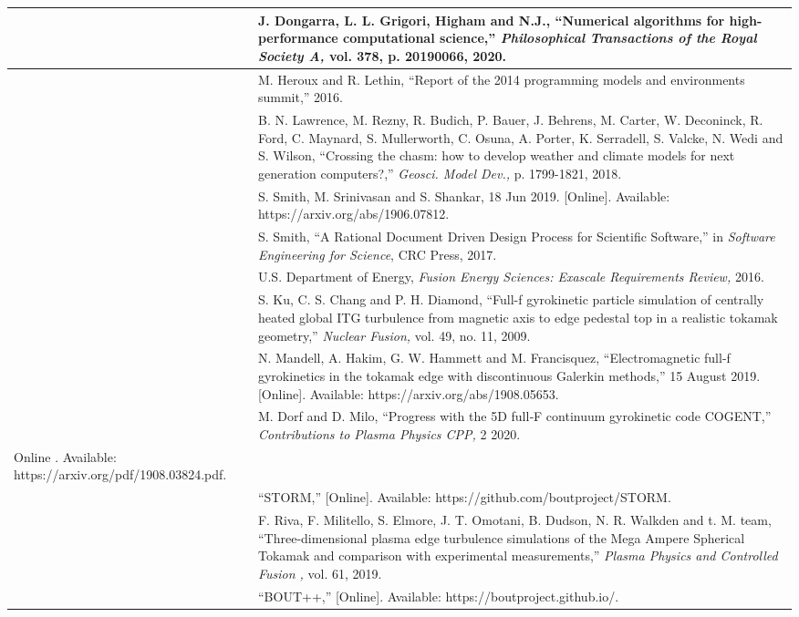 \documentclass{article}
\begin{document}
\baselineskip=12pt
\begin{tabular}{|>{\raggedright}p{8pt}|>{\raggedright}p{312pt}|}
\hline
[1]  & J. Dongarra, L. L. Grigori, Higham and N.J., ``Numerical algorithms for 
high-performance computational science,'' \textit{Philosophical Transactions of 
the Royal Society A, }vol. 378, p. 20190066, 2020. \tabularnewline
\hline
[2]  & M. Heroux and R. Lethin, ``Report of the 2014 programming models and environments 
summit,'' 2016.\tabularnewline
\hline
[3]  & B. N. Lawrence, M. Rezny, R. Budich, P. Bauer, J. Behrens, M. Carter, W. 
Deconinck, R. Ford, C. Maynard, S. Mullerworth, C. Osuna, A. Porter, K. Serradell, 
S. Valcke, N. Wedi and S. Wilson, ``Crossing the chasm: how to develop weather 
and climate models for next generation computers?,'' \textit{Geosci. Model Dev., 
}p. 1799-1821, 2018. \tabularnewline
\hline
[4]  & S. Smith, M. Srinivasan and S. Shankar, 18 Jun 2019. [Online]. Available: 
https://arxiv.org/abs/1906.07812.\tabularnewline
\hline
[5]  & S. Smith, ``A Rational Document Driven Design Process for Scientific Software,'' 
in \textit{Software Engineering for Science}, CRC Press, 2017. \tabularnewline
\hline
[6]  & U.S. Department of Energy, \textit{Fusion Energy Sciences: Exascale Requirements 
Review, }2016. \tabularnewline
\hline
[7]  & S. Ku, C. S. Chang and P. H. Diamond, ``Full-f gyrokinetic particle simulation 
of centrally heated global ITG turbulence from magnetic axis to edge pedestal top 
in a realistic tokamak geometry,'' \textit{Nuclear Fusion, }vol. 49, no. 11, 2009. 
\tabularnewline
\hline
[8]  & N. Mandell, A. Hakim, G. W. Hammett and M. Francisquez, ``Electromagnetic 
full-f gyrokinetics in the tokamak edge with discontinuous Galerkin methods,'' 
15 August 2019. [Online]. Available: https://arxiv.org/abs/1908.05653.\tabularnewline
\hline
[9]  & M. Dorf and D. Milo, ``Progress with the 5D full‐F continuum gyrokinetic 
code COGENT,'' \textit{Contributions to Plasma Physics CPP, }2 2020. \tabularnewline
\hline
\item [Online]. Available: https://arxiv.org/pdf/1908.03824.pdf.\tabularnewline
\hline
[11]  & ``STORM,'' [Online]. Available: https://github.com/boutproject/STORM.\tabularnewline
\hline
[12]  & F. Riva, F. Militello, S. Elmore, J. T. Omotani, B. Dudson, N. R. Walkden 
and t. M. team, ``Three-dimensional plasma edge turbulence simulations of the Mega 
Ampere Spherical Tokamak and comparison with experimental measurements,'' \textit{Plasma 
Physics and Controlled Fusion , }vol. 61, 2019. \tabularnewline
\hline
[13]  & ``BOUT++,'' [Online]. Available: https://boutproject.github.io/.\tabularnewline

\end{tabular}
\end{document}
